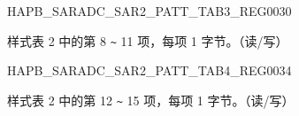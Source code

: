 \begin{register}{H}{APB\_SARADC\_SAR2\_PATT\_TAB3\_REG}{\hexprefix{}0030}\label{regdesc:APBSARADCSAR2PATTTAB3REG}
%
\regnewline%
\begin{regdesc}\begin{reglist}
\label{fielddesc:APBSARADCSAR2PATTTAB3}\item [APB\_SARADC\_SAR2\_PATT\_TAB3] 样式表 2 中的第 8 \verb+~+ 11 项，每项 1 字节。（读/写）
\end{reglist}\end{regdesc}
\end{register}


\begin{register}{H}{APB\_SARADC\_SAR2\_PATT\_TAB4\_REG}{\hexprefix{}0034}\label{regdesc:APBSARADCSAR2PATTTAB4REG}
%
\regnewline%
\begin{regdesc}\begin{reglist}
\label{fielddesc:APBSARADCSAR2PATTTAB4}\item [APB\_SARADC\_SAR2\_PATT\_TAB4] 样式表 2 中的第 12 \verb+~+ 15 项，每项 1 字节。（读/写）
\end{reglist}\end{regdesc}
\end{register}


